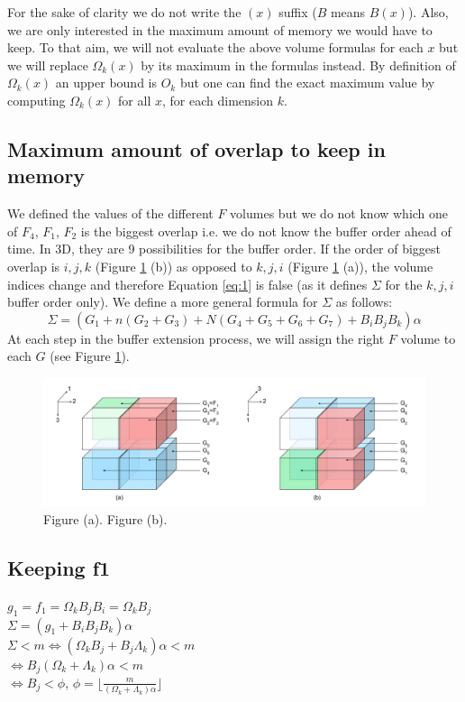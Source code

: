 \documentclass[conference]{IEEEtran}
\begin{document}
  For the sake of clarity we do not write the $(x)$ suffix ($B$ means $B(x)$).
  Also, we are only interested in the maximum amount of memory we would have to keep.
  To that aim, we will not evaluate the above volume formulas for each $x$ but we will replace $\Omega_k(x)$ by its maximum in the formulas instead.
  By definition of $\Omega_k(x)$ an upper bound is $O_k$ but one can find the exact maximum value by computing $\Omega_k(x)$ for all $x$, for each dimension $k$.

  \subsection{Maximum amount of overlap to keep in memory}
  We defined the values of the different $F$ volumes but we do not know which one of $F_4$, $F_1$, $F_2$ is the biggest overlap i.e. we do not know the buffer order ahead of time.
  In 3D, they are 9 possibilities for the buffer order.
  If the order of biggest overlap is $i, j, k$ (Figure \ref{fig:g_s} (b)) as opposed to $k, j, i$ (Figure \ref{fig:g_s} (a)), the volume indices change and therefore Equation \ref{eq:1} is false (as it defines $\Sigma$ for the $k,j,i$ buffer order only).
  We define a more general formula for $\Sigma$ as follows:
  $$\Sigma = (G_1 + n(G_2 + G_3) + N(G_4 + G_5 + G_6 + G_7) + B_iB_jB_k)\alpha$$
  At each step in the buffer extension process, we will assign the right $F$ volume to each $G$ (see Figure \ref{fig:g_s}).

  \begin{figure}[h]
  \centering
  \includegraphics[scale=0.45]{./figures/new/g_s.png}
  \caption{Figure (a).  Figure (b).
  }
  \label{fig:g_s}
  \end{figure}

  \subsection{Keeping f1}
  \noindent $g_1 = f_1 = \Omega_k B_j B_i = \Omega_k B_j$ \\
  $\Sigma = (g_1 + B_iB_jB_k)\alpha$ \\
  $\Sigma < m \Leftrightarrow (\Omega_k B_j + B_j \Lambda_k)\alpha < m$ \\
  $\Leftrightarrow B_j (\Omega_k + \Lambda_k) \alpha < m $ \\
  $\Leftrightarrow B_j < \phi$, $\phi = \lfloor \frac{m}{(\Omega_k + \Lambda_k)\alpha} \rfloor$
\end{document}
